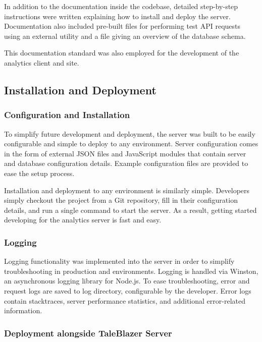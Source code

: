 In addition to the documentation inside the codebase, detailed step-by-step instructions were written explaining how to install and deploy the server. Documentation also included pre-built files for performing test API requests using an external utility and a file giving an overview of the database schema.

This documentation standard was also employed for the development of the analytics client and site.

\subsection{Installation and Deployment}

\subsubsection{Configuration and Installation}

To simplify future development and deployment, the server was built to be easily configurable and simple to deploy to any environment. Server configuration comes in the form of external JSON files and JavaScript modules that contain server and database configuration details. Example configuration files are provided to ease the setup process. 

Installation and deployment to any environment is similarly simple. Developers simply checkout the project from a Git repository, fill in their configuration details, and run a single command to start the server. As a result, getting started developing for the analytics server is fast and easy. 

\subsubsection{Logging}

Logging functionality was implemented into the server in order to simplify troubleshooting in production and environments. Logging is handled via Winston, an asynchronous logging library for Node.js. To ease troubleshooting, error and request logs are saved to log directory, configurable by the developer. Error logs contain stacktraces, server performance statistics, and additional error-related information.

\subsubsection{Deployment alongside TaleBlazer Server}

